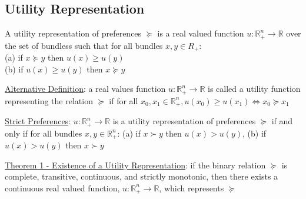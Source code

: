 \documentclass{article}
\begin{document}
\subsection{Utility Representation}
A utility representation of preferences $\succeq$ is a real valued function $u: \mathbb{R}_{+}^{n} \rightarrow \mathbb{R}$ over the set of bundless such that for all bundles $x,y \in R_{+}$: \\ (a) if $x \succeq y$ then $u(x) \geq u(y)$ \\ (b) if $u(x) \geq u(y)$ then $x \succeq y$ \par \vspace{0.3em}
  \underline{Alternative Definition}: a real values function $u: \mathbb{R}_{+}^{n} \rightarrow \mathbb{R}$ is called a utility function representing the relation $\succeq$ if for all $x_{0}, x_{1} \in \mathbb{R}_{+}^{n}, u(x_{0}) \geq u(x_{1}) \Longleftrightarrow x_{0} \succeq x_{1}$ \par
  \underline{Strict Preferences}: $u: \mathbb{R}_{+}^{n} \rightarrow \mathbb{R}$ is a utility representation of preferences $\succeq$ if and only if for all bundles $x, y \in \mathbb{R}_{+}^{n}$: (a) if $x \succ y$ then $u(x) > u(y)$, (b) if $u(x) > u(y)$ then $x \succ y$ \par
  \underline{Theorem 1 - Existence of a Utility Representation}: if the binary relation $\succeq$ is complete, transitive, continuous, and strictly monotonic, then there exists a continuous real valued function, $u: \mathbb{R}_{+}^{n} \rightarrow \mathbb{R}$, which represents $\succeq$
\end{document}
